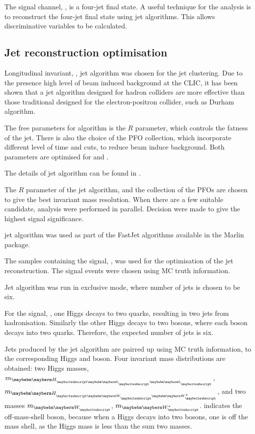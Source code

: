 The signal channel, \eeToHHbbWWHad, is a four-jet final state. A useful technique for the analysis is to reconstruct the four-jet final state using jet algorithms. This allows discriminative variables to be calculated.

\subsection{Jet reconstruction optimisation}
\label{sec:doubleHiggsJetOptimisation}
Longitudinal invariant, \kt, jet algorithm was chosen for the jet clustering. Due to the presence high level of beam induced background at the CLIC, it has been shown that a jet algorithm designed for hadron colliders are more effective than those traditional designed for the electron-positron collider, such as Durham algorithm.\cite{}

The free parameters for \kt algorithm is the $R$ parameter, which controls the fatness of the jet. There is also the choice of the PFO collection, which incorporate different level of time and \pT cuts, to reduce beam induce background. Both parameters are optimised for  and .

The details of jet algorithm can be found in \Section{}.

The $R$ parameter of the \kt jet algorithm, and the collection of the PFOs are chosen to give the best invariant mass resolution. When there are a few suitable candidate, analysis were performed in parallel. Decision were made to give the highest signal significance.

\kt jet algorithm was used as part of the FastJet algorithms available in the Marlin package.

The samples containing the signal, \eeToHHbbWWHad, was used for the optimisation of the jet reconstruction. The signal events were chosen using MC truth information.

Jet algorithm was run in exclusive mode, where number of jets is chosen to be six.

For the signal, \eeToHHbbWWHad, one Higgs decays to two \Pbottom quarks, resulting in two jets from hadronisation. Similarly the other Higgs decays to two \PW bosons, where each \PW boson decays into two quarks. Therefore, the expected number of jets is six.

Jets produced by the \kt jet algorithm are pairred up using MC truth information, to the corresponding Higgs and \PW boson. Four invariant mass distributions are obtained: two Higgs masses, $m_{\Hbb}$, $m_{\HWW}$, and two \PW masses $m_{\PW}$, $m_{\W*}$. \W* indicates the off-mass-shell \PW boson, because when a Higgs decays into two \PW bosons, one \PW is off the mass shell, as the Higgs mass is less than the sum two \PW masses.



